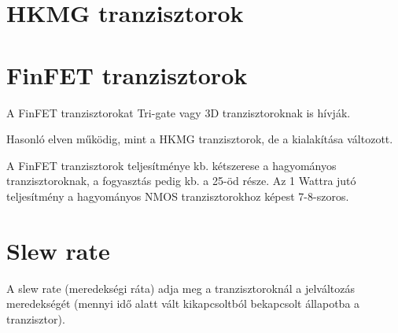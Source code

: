 \section{HKMG tranzisztorok}

\section{FinFET tranzisztorok}
A FinFET tranzisztorokat Tri-gate vagy 3D tranzisztoroknak is hívják.

Hasonló elven működig, mint a HKMG tranzisztorok, de a kialakítása változott.

A FinFET tranzisztorok teljesítménye kb. kétszerese a hagyományos tranzisztoroknak, a fogyasztás pedig kb. a 25-öd része.
Az 1 Wattra jutó teljesítmény a hagyományos NMOS tranzisztorokhoz képest 7-8-szoros.

\section{Slew rate}
A slew rate (meredekségi ráta) adja meg a tranzisztoroknál a jelváltozás meredekségét (mennyi idő alatt vált kikapcsoltból bekapcsolt állapotba a tranzisztor).